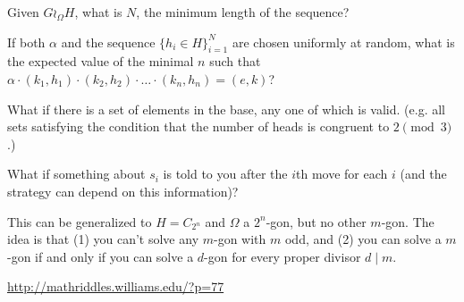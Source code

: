 \documentclass{article}
\begin{document}
\begin{related}
  \item Given $G \wr_\Omega H$, what is $N$, the minimum length of the sequence?
  \item If both $\alpha$ and the sequence $\{h_i \in H\}_{i=1}^N$ are chosen 
  uniformly at random, what is the expected value of the minimal $n$ such that $
    \alpha \cdot (k_1, h_1) \cdot (k_2, h_2) \cdot \dots \cdot (k_n, h_n) = (e, k)
  $?
  \item What if there is a set of elements in the base, any one of which is valid.
  (e.g. all sets satisfying the condition that the number of heads is congruent
  to $2 \pmod 3$.)
  \item What if something about $s_i$ is told to you after the $i$th move for each
    $i$ (and the strategy can depend on this information)?
\end{related}

\begin{note}
  This can be generalized to $H = C_{2^n}$ and $\Omega$ a $2^n$-gon, 
  but no other $m$-gon.
  The idea is that (1) you can't solve any $m$-gon with $m$ odd, and (2) you
  can solve a $m$-gon if and only if you can solve a $d$-gon for every proper
  divisor $d \mid m$.
\end{note}

\begin{references}
  \item \url{http://mathriddles.williams.edu/?p=77}
\end{references}
\end{document}
